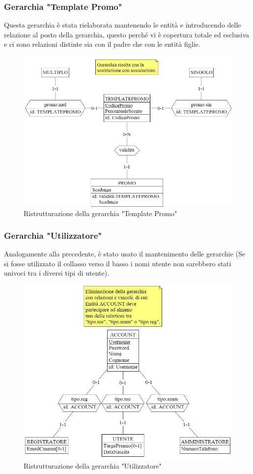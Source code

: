 \documentclass[a4paper,12pt]{report}
\begin{document}
\subsubsection{Gerarchia "Template Promo"}
Questa gerarchia è stata rielaborata mantenendo le entità e introducendo delle relazione al posto della gerarchia, questo perché vi è copertura totale ed esclusiva e ci sono relazioni distinte sia con il padre che con le entità figlie.
\begin{figure}[H]
	\centering
	\includegraphics[width=400pt]{ER/ristrutturazione/ristpromo.png}
	\caption{Ristrutturazione della gerarchia "Template Promo"}
\end{figure}
\subsubsection{Gerarchia "Utilizzatore"}
Analogamente alla precedente, è stato usato il mantenimento delle gerarchie (Se si fosse utilizzato il collasso verso il basso i nomi utente non sarebbero stati univoci tra i diversi tipi di utente).
\begin{figure}[H]
	\centering
	\includegraphics{ER/ristrutturazione/ristutenza.png}
	\caption{Ristrutturazione della gerarchia "Utilizzatore"}
\end{figure}
\end{document}
